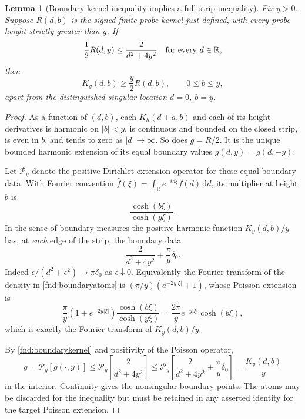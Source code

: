 \documentclass[11pt,a4paper]{article}
\newtheorem{lemma}[theorem]{Lemma}
\theoremstyle{definition}
\theoremstyle{remark}
\newcommand{\dd}{\mathrm d}
\begin{document}
\begin{lemma}[Boundary kernel inequality implies a full strip inequality]
\label{fnd:poisson}
Fix $y>0$. Suppose $R(d,b)$ is the signed finite probe kernel just defined,
with every probe height strictly greater than $y$. If
\begin{equation}
 \frac12R(d,y)\leq\frac{2}{d^2+4y^2}
 \quad\hbox{for every }d\in\mathbb R,
 \label{fnd:boundarykernel}
\end{equation}
then
\begin{equation}
 K_y(d,b)\geq\frac y2R(d,b),\qquad 0\leq b\leq y,
 \label{fnd:fullkernel}
\end{equation}
apart from the distinguished singular location $d=0$, $b=y$.
\end{lemma}
\begin{proof}
As a function of $(d,b)$, each $K_h(d+a,b)$ and each of its height
derivatives is harmonic on $|b|<y$, is continuous and bounded on the
closed strip, is even in $b$, and tends to zero as $|d|\to\infty$.
So does $g=R/2$. It is the unique bounded harmonic extension of its equal
boundary values $g(d,y)=g(d,-y)$.

Let $\mathcal P_y$ denote the positive Dirichlet extension operator for
these equal boundary data. With Fourier convention
$\widehat f(\xi)=\int_{\mathbb R}e^{-id\xi}f(d)\,\dd d$, its multiplier
at height $b$ is
\[
 \frac{\cosh(b\xi)}{\cosh(y\xi)}.
\]
In the sense of boundary measures the positive harmonic function
$K_y(d,b)/y$ has, at \emph{each} edge of the strip, the boundary data
\begin{equation}
 \frac{2}{d^2+4y^2}+\frac\pi y\delta_0.
 \label{fnd:boundaryatoms}
\end{equation}
Indeed
$\epsilon/(d^2+\epsilon^2)\to\pi\delta_0$ as $\epsilon\downarrow0$.
Equivalently the Fourier transform of the density in
\eqref{fnd:boundaryatoms} is
$(\pi/y)(e^{-2y|\xi|}+1)$, whose Poisson extension is
\[
 \frac\pi y(1+e^{-2y|\xi|})
       \frac{\cosh(b\xi)}{\cosh(y\xi)}
 =\frac{2\pi}{y}e^{-y|\xi|}\cosh(b\xi),
\]
which is exactly the Fourier transform of $K_y(d,b)/y$.

By \eqref{fnd:boundarykernel} and positivity of the Poisson operator,
\[
 g=\mathcal P_y[g(\cdot,y)]
 \leq\mathcal P_y\left[\frac{2}{d^2+4y^2}\right]
 \leq\mathcal P_y\left[\frac{2}{d^2+4y^2}+\frac\pi y\delta_0\right]
 =\frac{K_y(d,b)}{y}
\]
in the interior. Continuity gives the nonsingular boundary points.
The atoms may be discarded for the inequality but must be retained in
any asserted identity for the target Poisson extension.
\end{proof}
\end{document}
